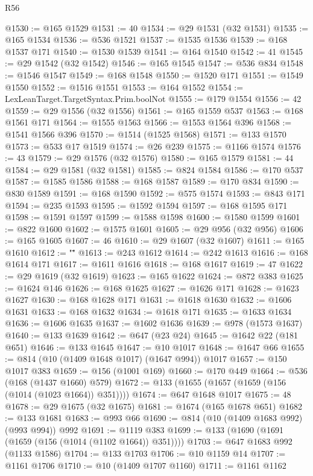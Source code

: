 \begin{lexlean}{R56}
\begin{coremodule}
{{{{{{{{{{{{{{{{{{{{{{{{{{{{{{{{{{{{{{{{{{{{{{{{{{{{{{{{{{{{{{{{{{{{{{{{{{{{{{{{{{{{{{{{{{{{{{{{{{{{{{{{{{{{{{{{{{{{{{{{{{{{{{{{{{{{{{{{{{{{{{{{{{{{{{{{{{{{{{{{{{{{{{{{{{{{{{{{{{{{{{{{{{{{{{{{{{{{{{{{{{{{{{{{{{{@1530 := @165 @1529
@1531 := 40
@1534 := @29 @1531 (@32 @1531)
@1535 := @165 @1534
@1536 := @536 @1521
@1537 := @1535 @1536
@1539 := @168 @1537 @171
@1540 := @1530 @1539
@1541 := @164 @1540
@1542 := 41
@1545 := @29 @1542 (@32 @1542)
@1546 := @165 @1545
@1547 := @536 @834
@1548 := @1546 @1547
@1549 := @168 @1548
@1550 := @1520 @171
@1551 := @1549 @1550
@1552 := @1516 @1551
@1553 := @164 @1552
@1554 := LexLeanTarget.TargetSyntax.Prim.boolNot
@1555 := @179 @1554
@1556 := 42
@1559 := @29 @1556 (@32 @1556)
@1561 := @165 @1559 @537
@1563 := @168 @1561 @171
@1564 := @1555 @1563
@1566 := @1553 @1564 @396
@1568 := @1541 @1566 @396
@1570 := @1514 (@1525 @1568)
@1571 := @133 @1570
@1573 := @533 @17 @1519
@1574 := @26 @239
@1575 := @1166 @1574
@1576 := 43
@1579 := @29 @1576 (@32 @1576)
@1580 := @165 @1579
@1581 := 44
@1584 := @29 @1581 (@32 @1581)
@1585 := @824 @1584
@1586 := @170 @537
@1587 := @1585 @1586
@1588 := @168 @1587
@1589 := @170 @834
@1590 := @830 @1589
@1591 := @168 @1590
@1592 := @575 @1574
@1593 := @843 @171
@1594 := @235 @1593
@1595 := @1592 @1594
@1597 := @168 @1595 @171
@1598 := @1591 @1597
@1599 := @1588 @1598
@1600 := @1580 @1599
@1601 := @822 @1600
@1602 := @1575 @1601
@1605 := @29 @956 (@32 @956)
@1606 := @165 @1605
@1607 := 46
@1610 := @29 @1607 (@32 @1607)
@1611 := @165 @1610
@1612 := "\""
@1613 := @243 @1612
@1614 := @242 @1613
@1616 := @168 @1614 @171
@1617 := @1611 @1616
@1618 := @168 @1617
@1619 := 47
@1622 := @29 @1619 (@32 @1619)
@1623 := @165 @1622
@1624 := @872 @383
@1625 := @1624 @146
@1626 := @168 @1625
@1627 := @1626 @171
@1628 := @1623 @1627
@1630 := @168 @1628 @171
@1631 := @1618 @1630
@1632 := @1606 @1631
@1633 := @168 @1632
@1634 := @1618 @171
@1635 := @1633 @1634
@1636 := @1606 @1635
@1637 := @1602 @1636
@1639 := @978 (@1573 @1637)
@1640 := @133 @1639
@1642 := @647 (@23 @24)
@1645 := @1642 @22 (@181 @651)
@1646 := @133 @1645
@1647 := @10 @1017
@1648 := @1647 @66
@1655 := @814 (@10 (@1409 @1648 @1017) (@1647 @994)) @1017
@1657 := @150 @1017 @383
@1659 := @156 (@1001 @169)
@1660 := @170 @449
@1664 := @536 (@168 (@1437 @1660) @579)
@1672 := @133 (@1655 (@1657 (@1659 (@156 (@1014 (@1023 @1664)) @351))))
@1674 := @647 @1648 @1017
@1675 := 48
@1678 := @29 @1675 (@32 @1675)
@1681 := @1674 (@165 @1678 @651)
@1682 := @133 @1681
@1683 := @993 @66
@1690 := @814 (@10 (@1409 @1683 @992) (@993 @994)) @992
@1691 := @1119 @383
@1699 := @133 (@1690 (@1691 (@1659 (@156 (@1014 (@1102 @1664)) @351))))
@1703 := @647 @1683 @992 (@1133 @1586)
@1704 := @133 @1703
@1706 := @10 @1159 @14
@1707 := @1161 @1706
@1710 := @10 (@1409 @1707 @1160)
@1711 := @1161 @1162
}}}}}}}}}}}}}}}}}}}}}}}}}}}}}}}}}}}}}}}}}}}}}}}}}}}}}}}}}}}}}}}}}}}}}}}}}}}}}}}}}}}}}}}}}}}}}}}}}}}}}}}}}}}}}}}}}}}}}}}}}}}}}}}}}}}}}}}}}}}}}}}}}}}}}}}}}}}}}}}}}}}}}}}}}}}}}}}}}}}}}}}}}}}}}}}}}}}}}}}}}}}}}}}}}}}
\end{coremodule}
\end{lexlean}
